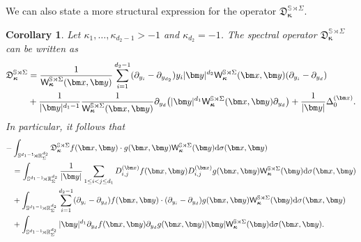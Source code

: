 \documentclass{amsart}
\newtheorem{cor}[thm]{Corollary}
\theoremstyle{remark}
\def\la{{\langle}}
\def\ra{{\rangle}}
\def\d{\mathrm{d}}
\def\sW{{\mathsf W}}
\def\fD{{\mathfrak D}}
\def\k{{\kappa}}
\def\s{\sigma}
\def\la{{\langle}}
\def\ra{{\rangle}}
\def\xb{{\bm x}}
\def\yb{{\bm y}}
\def\RR{{\mathbb R}}
\def\SS{{\mathbb S}}
\def\bk{{\boldsymbol{\kappa}}}
\begin{document}
We can also state a more structural expression for the operator $\fD_\bk^{\SS \rtimes \Sigma}$. 
\begin{cor} \label{cor:SSL0}
Let $\k_1,\ldots, \k_{d_2-1} > -1$ and $\k_{d_2} = -1$. The spectral operator $\fD_{\bk}^{\SS \rtimes \Sigma} $ can be 
written as 
\begin{align} \label{eq:diff-eqnSSL0}
  \fD_{\bk}^{\SS \rtimes \Sigma} & = 
   \frac{1}{\sW_{\bk}^{\SS \rtimes \Sigma} (\bm x, \bm y)}  
       \sum_{i=1}^{d_2-1} (\partial_{y_i} - \partial_{y_{d_2}}) y_i |\yb|^{d_2} \sW_{\bk}^{\SS \rtimes \Sigma} (\bm x, \bm y)
         (\partial_{y_i} - \partial_{y_d}) \\
   & +  \frac{1}{|\bm y|^{d_1-1}} \frac{1}{\sW_{\bk}^{\SS \rtimes \Sigma} (\bm x, \bm y)}     
        \partial_{y_d}  \big( |\bm y|^{d_1} \sW_{\bk}^{\SS \rtimes \Sigma} (\bm x, \bm y) \partial_{y_d} \big)
        + \frac{1}{|\bm y|} \Delta_0^{(\bm x)}. \notag 
 \end{align}
In particular, it follows that 
\begin{align} \label{eq:self-adjSSL0} 
    - &\int_{\SS^{d_1-1}\! \rtimes \RR_\Sigma^{d_2}}\fD_{\bk}^{\SS \rtimes \Sigma} 
    f (\bm x,\bm y) \cdot g(\bm x, \bm y) \sW_{\bk}^{\SS \rtimes \Sigma} (\bm y) \d \s(\bm x, \bm y)  \\ 
  &   =  \int_{\SS^{d_1-1}\! \rtimes \RR_\Sigma^{d_2}}  \frac{1}{|\bm y|}  \sum_{1 \le i< j \le d_1}  D_{i,j}^{(\bm x)} f(\bm x, \bm y)  D_{i,j}^{(\bm x)} g(\bm x, \bm y) 
  \sW_{\bk}^{\SS \rtimes \Sigma}(\bm y)  \d \s(\xb, \yb)    \notag \\ 
  & + \int_{\SS^{d_1-1}\! \rtimes \RR_\Sigma^{d_2}}   \sum_{i=1}^{d_2-1} (\partial_{y_i} - \partial_{y_d}) f(\bm x,\bm y) \cdot 
    (\partial_{y_i} - \partial_{y_d})g(\bm x,\bm y)
  \sW_{\bk}^{\SS \rtimes \Sigma}(\bm y)  \d \s(\bm x, \bm y)    \notag \\
    &  +  \int_{\SS^{d_1-1}\! \rtimes \RR_\Sigma^{d_2}}  |\yb|^{d_1} \partial_{y_d} f(\bm x,\bm y) \partial_{y_d} g(\bm x,\bm y) 
       |\yb| \sW_{\bk}^{\SS \rtimes \Sigma}(\bm y)   \d \s(\bm x,\bm y).  \notag
 \end{align}
 \end{cor}
\end{document}
